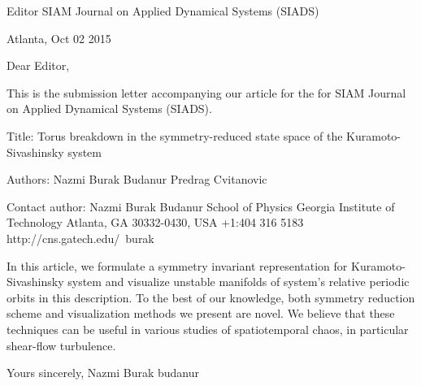 
        Editor
        SIAM Journal on Applied Dynamical Systems (SIADS)

                                            Atlanta, Oct 02 2015

Dear Editor,

This is the submission letter accompanying our article for the
for SIAM Journal on Applied Dynamical Systems (SIADS).

Title:
    Torus breakdown in the symmetry-reduced state
    space of the Kuramoto-Sivashinsky system

Authors:
    Nazmi Burak Budanur
    Predrag Cvitanovic

Contact author:
    Nazmi Burak Budanur
        School of Physics
        Georgia Institute of Technology
        Atlanta, GA 30332-0430, USA
        +1:404 316 5183
        http://cns.gatech.edu/~burak

In this article, we formulate a symmetry invariant representation for 
Kuramoto-Sivashinsky system and visualize unstable manifolds of 
system's relative periodic orbits in this description. To the best of
our knowledge, both symmetry reduction scheme and visualization 
methods we present are novel. We believe that these techniques can
be useful in various studies of spatiotemporal chaos, in particular 
shear-flow turbulence.  

Yours sincerely,
   Nazmi Burak budanur
